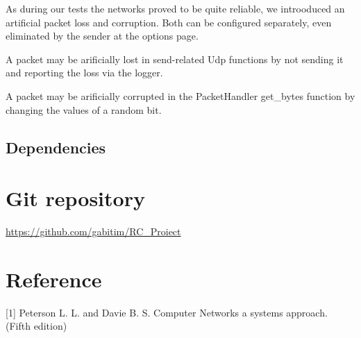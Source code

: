 \documentclass[12pt]{article}
\begin{document}
As during our tests the networks proved to be quite reliable, we introoduced an artificial packet loss and corruption. Both can be configured separately, even eliminated by the sender at the options page.

A packet may be arificially lost in send-related Udp functions by not sending it and reporting the loss via the logger.

A packet may be arificially corrupted in the PacketHandler get\_bytes function by changing the values of a random bit.

\subsection{Dependencies}


\section{Git repository}

\url{https://github.com/gabitim/RC_Proiect}

\section{Reference}

\small

[1] Peterson L. L. and Davie B. S. Computer Networks a systems approach. (Fifth edition)
\end{document}

